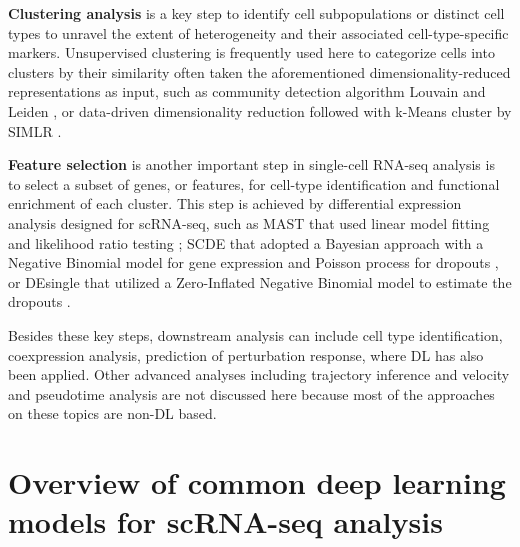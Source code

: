 \documentclass[
]{book}
\begin{document}
\textbf{Clustering analysis} is a key step to identify cell subpopulations or distinct cell types to unravel the extent of heterogeneity and their associated cell-type-specific markers. Unsupervised clustering is frequently used here to categorize cells into clusters by their similarity often taken the aforementioned dimensionality-reduced representations as input, such as community detection algorithm Louvain \citep{RN36} and Leiden \citep{RN37}, or data-driven dimensionality reduction followed with k-Means cluster by SIMLR \citep{RN38}.

\textbf{Feature selection} is another important step in single-cell RNA-seq analysis is to select a subset of genes, or features, for cell-type identification and functional enrichment of each cluster. This step is achieved by differential expression analysis designed for scRNA-seq, such as MAST that used linear model fitting and likelihood ratio testing \citep{RN40}; SCDE that adopted a Bayesian approach with a Negative Binomial model for gene expression and Poisson process for dropouts \citep{RN41}, or DEsingle that utilized a Zero-Inflated Negative Binomial model to estimate the dropouts \citep{RN42}.

Besides these key steps, downstream analysis can include cell type identification, coexpression analysis, prediction of perturbation response, where DL has also been applied. Other advanced analyses including trajectory inference and velocity and pseudotime analysis are not discussed here because most of the approaches on these topics are non-DL based.

\hypertarget{ch-3}{%
\chapter{Overview of common deep learning models for scRNA-seq analysis}\label{ch-3}}
\end{document}
